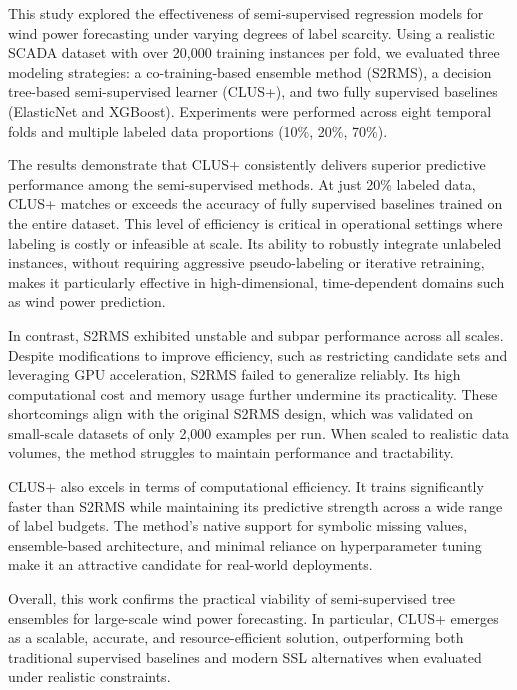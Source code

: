 This study explored the effectiveness of semi-supervised regression models for wind power forecasting under varying degrees of label scarcity. Using a realistic SCADA dataset with over 20,000 training instances per fold, we evaluated three modeling strategies: a co-training-based ensemble method (S2RMS), a decision tree-based semi-supervised learner (CLUS+), and two fully supervised baselines (ElasticNet and XGBoost). Experiments were performed across eight temporal folds and multiple labeled data proportions (10\%, 20\%, 70\%).

The results demonstrate that CLUS+ consistently delivers superior predictive performance among the semi-supervised methods. At just 20\% labeled data, CLUS+ matches or exceeds the accuracy of fully supervised baselines trained on the entire dataset. This level of efficiency is critical in operational settings where labeling is costly or infeasible at scale. Its ability to robustly integrate unlabeled instances, without requiring aggressive pseudo-labeling or iterative retraining, makes it particularly effective in high-dimensional, time-dependent domains such as wind power prediction.

In contrast, S2RMS exhibited unstable and subpar performance across all scales. Despite modifications to improve efficiency, such as restricting candidate sets and leveraging GPU acceleration, S2RMS failed to generalize reliably. Its high computational cost and memory usage further undermine its practicality. These shortcomings align with the original S2RMS design, which was validated on small-scale datasets of only 2,000 examples per run. When scaled to realistic data volumes, the method struggles to maintain performance and tractability.

CLUS+ also excels in terms of computational efficiency. It trains significantly faster than S2RMS while maintaining its predictive strength across a wide range of label budgets. The method’s native support for symbolic missing values, ensemble-based architecture, and minimal reliance on hyperparameter tuning make it an attractive candidate for real-world deployments.

Overall, this work confirms the practical viability of semi-supervised tree ensembles for large-scale wind power forecasting. In particular, CLUS+ emerges as a scalable, accurate, and resource-efficient solution, outperforming both traditional supervised baselines and modern SSL alternatives when evaluated under realistic constraints.
